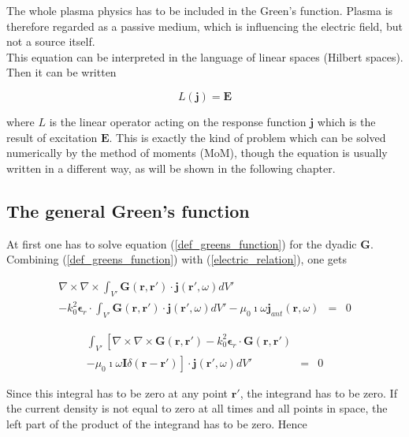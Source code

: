 \documentclass[a4paper,11pt]{thesis}
\begin{document}
The whole plasma physics has to be included in the Green's function. Plasma is therefore regarded as a passive medium, which is influencing the electric field, but not a source itself.\\

This equation can be interpreted in the language of linear spaces (Hilbert spaces). Then it can be written

\begin{equation}
 L(\mathbf{j})=\mathbf{E}
\end{equation}

where $L$ is the linear operator acting on the response function $\textbf{j}$ which is the result of excitation $\textbf{E}$. This is exactly the kind of problem which can be solved numerically by the method of moments (MoM), though the equation is usually written in a different way, as will be shown in the following chapter.

\subsection{The general Green's function}
At first one has to solve equation (\ref{def_greens_function}) for the dyadic \textbf{G}. Combining (\ref{def_greens_function}) with (\ref{electric_relation}), one gets

\begin{eqnarray}
\nabla \times \nabla \times \int_{V'} \mathbf{G}(\mathbf{r},\mathbf{r'})\cdot \mathbf{j}(\mathbf{r'},\omega) dV' \nonumber \\
-   k_0^2 \mathbf{\epsilon}_r\cdot \int_{V'} \mathbf{G}(\mathbf{r},\mathbf{r'})\cdot \mathbf{j}(\mathbf{r'},\omega) dV' - \mu_0 \imath \omega   \mathbf{j}_{ant}(\mathbf{r},\omega) &=& 0
\end{eqnarray}


\begin{eqnarray}
\int_{V'} \left[ \nabla \times \nabla \times  \mathbf{G}(\mathbf{r},\mathbf{r'}) -   k_0^2 \mathbf{\epsilon}_r\cdot  \mathbf{G}(\mathbf{r},\mathbf{r'}) \right.\nonumber\\
\left.- \mu_0 \imath \omega \mathbf{I}  \delta (\mathbf{r}-\mathbf{r'}) \right]\cdot \mathbf{j}(\mathbf{r'},\omega) dV' &=& 0
\end{eqnarray}

Since this integral has to be zero at any point $\mathbf{r'}$, the integrand has to be zero. If the current density is not equal to zero at all times and all points in space, the left part of the product of the integrand has to be zero. Hence
\end{document}
